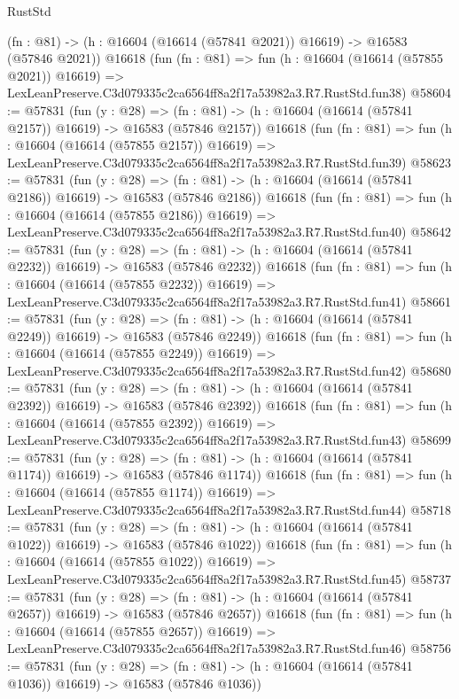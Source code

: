 \begin{lexlean}{RustStd}
\begin{coremodule}
    (fn : @81) -> (h : @16604 (@16614 (@57841 @2021)) @16619) -> @16583 (@57846 @2021))
    @16618
    (fun (fn : @81) =>
    fun (h : @16604 (@16614 (@57855 @2021)) @16619) =>
    LexLeanPreserve.C3d079335c2ca6564ff8a2f17a53982a3.R7.RustStd.fun38)
@58604 := @57831
    (fun (y : @28) =>
    (fn : @81) -> (h : @16604 (@16614 (@57841 @2157)) @16619) -> @16583 (@57846 @2157))
    @16618
    (fun (fn : @81) =>
    fun (h : @16604 (@16614 (@57855 @2157)) @16619) =>
    LexLeanPreserve.C3d079335c2ca6564ff8a2f17a53982a3.R7.RustStd.fun39)
@58623 := @57831
    (fun (y : @28) =>
    (fn : @81) -> (h : @16604 (@16614 (@57841 @2186)) @16619) -> @16583 (@57846 @2186))
    @16618
    (fun (fn : @81) =>
    fun (h : @16604 (@16614 (@57855 @2186)) @16619) =>
    LexLeanPreserve.C3d079335c2ca6564ff8a2f17a53982a3.R7.RustStd.fun40)
@58642 := @57831
    (fun (y : @28) =>
    (fn : @81) -> (h : @16604 (@16614 (@57841 @2232)) @16619) -> @16583 (@57846 @2232))
    @16618
    (fun (fn : @81) =>
    fun (h : @16604 (@16614 (@57855 @2232)) @16619) =>
    LexLeanPreserve.C3d079335c2ca6564ff8a2f17a53982a3.R7.RustStd.fun41)
@58661 := @57831
    (fun (y : @28) =>
    (fn : @81) -> (h : @16604 (@16614 (@57841 @2249)) @16619) -> @16583 (@57846 @2249))
    @16618
    (fun (fn : @81) =>
    fun (h : @16604 (@16614 (@57855 @2249)) @16619) =>
    LexLeanPreserve.C3d079335c2ca6564ff8a2f17a53982a3.R7.RustStd.fun42)
@58680 := @57831
    (fun (y : @28) =>
    (fn : @81) -> (h : @16604 (@16614 (@57841 @2392)) @16619) -> @16583 (@57846 @2392))
    @16618
    (fun (fn : @81) =>
    fun (h : @16604 (@16614 (@57855 @2392)) @16619) =>
    LexLeanPreserve.C3d079335c2ca6564ff8a2f17a53982a3.R7.RustStd.fun43)
@58699 := @57831
    (fun (y : @28) =>
    (fn : @81) -> (h : @16604 (@16614 (@57841 @1174)) @16619) -> @16583 (@57846 @1174))
    @16618
    (fun (fn : @81) =>
    fun (h : @16604 (@16614 (@57855 @1174)) @16619) =>
    LexLeanPreserve.C3d079335c2ca6564ff8a2f17a53982a3.R7.RustStd.fun44)
@58718 := @57831
    (fun (y : @28) =>
    (fn : @81) -> (h : @16604 (@16614 (@57841 @1022)) @16619) -> @16583 (@57846 @1022))
    @16618
    (fun (fn : @81) =>
    fun (h : @16604 (@16614 (@57855 @1022)) @16619) =>
    LexLeanPreserve.C3d079335c2ca6564ff8a2f17a53982a3.R7.RustStd.fun45)
@58737 := @57831
    (fun (y : @28) =>
    (fn : @81) -> (h : @16604 (@16614 (@57841 @2657)) @16619) -> @16583 (@57846 @2657))
    @16618
    (fun (fn : @81) =>
    fun (h : @16604 (@16614 (@57855 @2657)) @16619) =>
    LexLeanPreserve.C3d079335c2ca6564ff8a2f17a53982a3.R7.RustStd.fun46)
@58756 := @57831
    (fun (y : @28) =>
    (fn : @81) -> (h : @16604 (@16614 (@57841 @1036)) @16619) -> @16583 (@57846 @1036))

\end{coremodule}
\end{lexlean}
